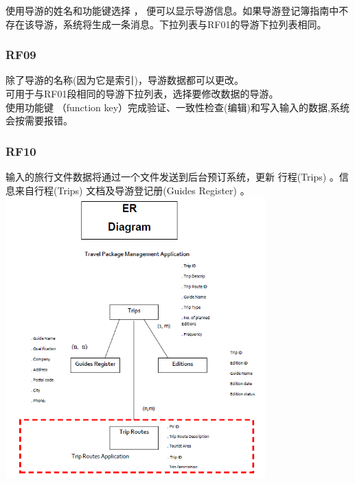 使用导游的姓名和功能键选择 ， 便可以显示导游信息。如果导游登记簿指南中不存在该导游，系统将生成一条消息。下拉列表与RF01的导游下拉列表相同。\\


\hypertarget{ux63a5ux4e58ux5ba2}{%
\subsubsection{RF09}\label{ux63a5ux4e58ux5ba2}}

除了导游的名称(因为它是索引)，导游数据都可以更改。\\
可用于与RF01段相同的导游下拉列表，选择要修改数据的导游。\\
使用功能键 （function key）完成验证、一致性检查(编辑)和写入输入的数据,系统会按需要报错。\\

\hypertarget{ux63a5ux4e58ux5ba2}{%
\subsubsection{RF10}\label{ux63a5ux4e58ux5ba2}}

输入的旅行文件数据将通过一个文件发送到后台预订系统，更新 行程(Trips) 。信息来自行程(Trips) 文档及导游登记册(Guides Register) 。\\



\includegraphics[width=10cm]{Sifp31.png}

